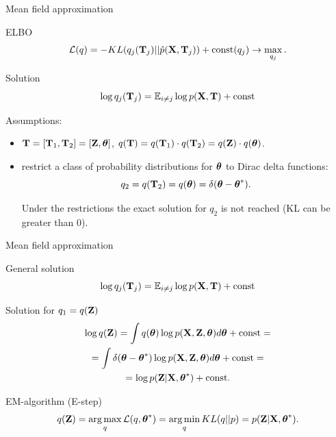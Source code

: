\documentclass{beamer}
\begin{document}
\begin{frame}{Mean field approximation}
	\begin{block}{ELBO}
		\[
			\mathcal{L} (q) = - KL (q_j(\mathbf{T}_j) || \hat{p}(\mathbf{X}, \mathbf{T}_j))  + \text{const}(q_j) \rightarrow \max_{q_j}.
		\]
		\vspace{-0.3cm}
	\end{block}
	\begin{block}{Solution}
		\vspace{-0.3cm}
		\[
			\log q_j(\mathbf{T}_j) = \mathbb{E}_{i \neq j} \log p(\mathbf{X}, \mathbf{T}) + \text{const}
		\]
		\vspace{-0.3cm}
	\end{block}
	Assumptions: 
	\begin{itemize}
		\item $\mathbf{T} = [\mathbf{T}_1, \mathbf{T}_2] = [\mathbf{Z}, \boldsymbol{\theta}]$, $q(\mathbf{T}) = q(\mathbf{T}_1) \cdot q(\mathbf{T}_2) = q(\mathbf{Z}) \cdot q(\boldsymbol{\theta})$.
		\item restrict a class of probability distributions for $\boldsymbol{\theta}$ to Dirac delta functions:
		\[
			q_2 = q(\mathbf{T}_2) = q(\boldsymbol{\theta}) = \delta(\boldsymbol{\theta} - \boldsymbol{\theta}^*).
		\]
		
		Under the restrictions the exact solution for $q_2$ is not reached (KL can be greater than 0).
	\end{itemize}
\end{frame}
\begin{frame}{Mean field approximation}
	\begin{block}{General solution}
		\vspace{-0.3cm}
		\[
		\log q_j(\mathbf{T}_j) = \mathbb{E}_{i \neq j} \log p(\mathbf{X}, \mathbf{T}) + \text{const}
		\]
		\vspace{-0.3cm}
	\end{block}
	\begin{block}{Solution for $q_1 = q(\mathbf{Z})$}
		\vspace{-0.3cm}
		\begin{multline*}
			\log q(\mathbf{Z}) = \int q(\boldsymbol{\theta}) \log p(\mathbf{X}, \mathbf{Z},  \boldsymbol{\theta}) d\boldsymbol{\theta} + \text{const} = \\
			= \int \delta(\boldsymbol{\theta} - \boldsymbol{\theta}^*) \log p(\mathbf{X}, \mathbf{Z},  \boldsymbol{\theta}) d\boldsymbol{\theta} + \text{const} = \\
			= \log p (\mathbf{Z} | \mathbf{X}, \boldsymbol{\theta}^*) +  \text{const}.
		\end{multline*}
	\end{block}
	\vspace{-0.3cm}
	\begin{block}{EM-algorithm (E-step)}
		\vspace{-0.3cm}
	\[
		q(\mathbf{Z}) = \operatorname*{arg\,max}_q \mathcal{L} (q, \boldsymbol{\theta}^*) = \operatorname*{arg\,min}_q KL(q || p) = p(\mathbf{Z}| \mathbf{X}, \boldsymbol{\theta}^*).
	\]
	\end{block}
\end{frame}
\end{document}
